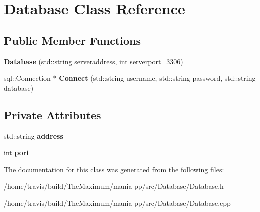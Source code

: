 \hypertarget{classDatabase}{\section{Database Class Reference}
\label{classDatabase}
}
\subsection*{Public Member Functions}
\begin{DoxyCompactItemize}
\item 
\hypertarget{classDatabase_a9f82bd69435193ee6e66449ddb6a1c27}{{\bfseries Database} (std\-::string serveraddress, int serverport=3306)}\label{classDatabase_a9f82bd69435193ee6e66449ddb6a1c27}

\item 
\hypertarget{classDatabase_a22555b63ce54c0b4a0e1b1aecb5e1bd4}{sql\-::\-Connection $\ast$ {\bfseries Connect} (std\-::string username, std\-::string password, std\-::string database)}\label{classDatabase_a22555b63ce54c0b4a0e1b1aecb5e1bd4}

\end{DoxyCompactItemize}
\subsection*{Private Attributes}
\begin{DoxyCompactItemize}
\item 
\hypertarget{classDatabase_aaf36450a11d38f6fde645bb8a0d07381}{std\-::string {\bfseries address}}\label{classDatabase_aaf36450a11d38f6fde645bb8a0d07381}

\item 
\hypertarget{classDatabase_a6557601838cc506cd59638f4c368f5c2}{int {\bfseries port}}\label{classDatabase_a6557601838cc506cd59638f4c368f5c2}

\end{DoxyCompactItemize}


The documentation for this class was generated from the following files\-:\begin{DoxyCompactItemize}
\item 
/home/travis/build/\-The\-Maximum/mania-\/pp/src/\-Database/Database.\-h\item 
/home/travis/build/\-The\-Maximum/mania-\/pp/src/\-Database/Database.\-cpp\end{DoxyCompactItemize}
